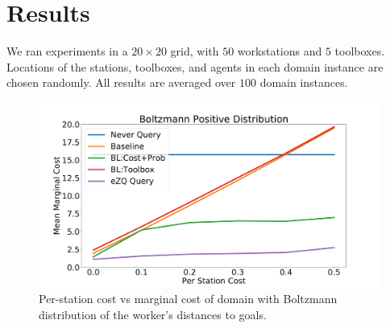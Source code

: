 \documentclass[letterpaper]{article}
\begin{document}







\section{Results}
We ran experiments in a $20\times 20$ grid, with $50$ workstations and $5$ toolboxes. Locations of the stations, toolboxes, and agents in each domain instance are chosen randomly. All results are averaged over $100$ domain instances.



\begin{figure}[t]
    \centering
    \includegraphics[width=\linewidth]{Figures/CAT_AAAI_BoltzmannPositive.pdf}
    \caption{Per-station cost vs marginal cost of domain with Boltzmann distribution of the worker's distances to goals.}
    \label{fig:dist}
\end{figure}
\end{document}

